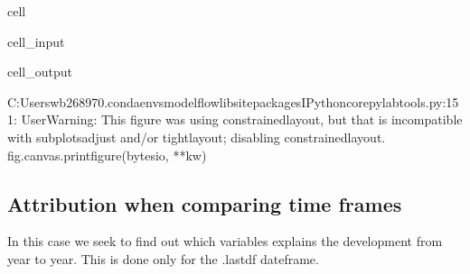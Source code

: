 \documentclass[letterpaper,10pt,english]{jupyterBook}
\begin{document}
\begin{sphinxuseclass}{cell}\begin{sphinxVerbatimInput}

\begin{sphinxuseclass}{cell_input}
\begin{sphinxVerbatim}[commandchars=\\\{\}]
 
\end{sphinxVerbatim}

\end{sphinxuseclass}\end{sphinxVerbatimInput}
\begin{sphinxVerbatimOutput}

\begin{sphinxuseclass}{cell_output}
\begin{sphinxVerbatim}[commandchars=\\\{\}]
C:\PYGZbs{}Users\PYGZbs{}wb268970\PYGZbs{}.conda\PYGZbs{}envs\PYGZbs{}modelflow\PYGZbs{}lib\PYGZbs{}site\PYGZhy{}packages\PYGZbs{}IPython\PYGZbs{}core\PYGZbs{}pylabtools.py:151: UserWarning: This figure was using constrained\PYGZus{}layout, but that is incompatible with subplots\PYGZus{}adjust and/or tight\PYGZus{}layout; disabling constrained\PYGZus{}layout.
  fig.canvas.print\PYGZus{}figure(bytes\PYGZus{}io, **kw)
\end{sphinxVerbatim}

\noindent{}

\end{sphinxuseclass}\end{sphinxVerbatimOutput}

\end{sphinxuseclass}

\subsection{Attribution when comparing time frames}
\label{\detokenize{content/06_ModelAnalytics/Attribution:attribution-when-comparing-time-frames}}
\sphinxAtStartPar
In this case we seek to find out which variables explains the development from year to year. This is done only for the .lastdf dateframe.
\end{document}
